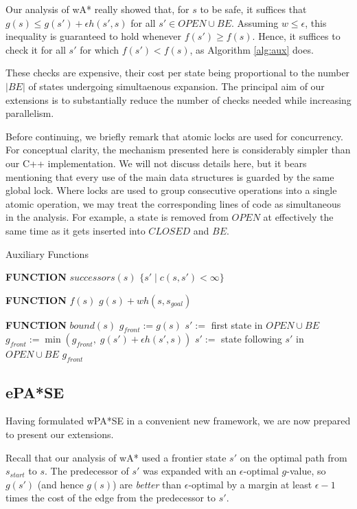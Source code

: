 \documentclass[letterpaper]{article}
\begin{document}
Our analysis of wA* really showed that, for $s$ to be safe, it suffices that $g(s) \le g(s') + \epsilon h(s', s)$ for all $s'\in OPEN\cup BE$. Assuming $w \le \epsilon$, this inequality is guaranteed to hold whenever $f(s') \ge f(s)$. Hence, it suffices to check it for all $s'$ for which $f(s') < f(s)$, as Algorithm \ref{alg:aux} does.

These checks are expensive, their cost per state being proportional to the number $|BE|$ of states undergoing simultaenous expansion. The principal aim of our extensions is to substantially reduce the number of checks needed while increasing parallelism.

Before continuing, we briefly remark that atomic locks are used for concurrency. For conceptual clarity, the mechanism presented here is considerably simpler than our C++ implementation. We will not discuss details here, but it bears mentioning that every use of the main data structures is guarded by the same global lock. Where locks are used to group consecutive operations into a single atomic operation, we may treat the corresponding lines of code as simultaneous in the analysis. For example, a state is removed from $OPEN$ at effectively the same time as it gets inserted into $CLOSED$ and $BE$.

\begin{algorithm}
\caption{Auxiliary Functions}
\label{alg:aux}
\begin{algorithmic}
\STATE \textbf{FUNCTION} $successors(s)$
\RETURN $\{s' \mid c(s,s')<\infty\}$

\STATE \textbf{FUNCTION} $f(s)$
\RETURN $g(s) + wh(s,s_{goal})$

\STATE \textbf{FUNCTION} $bound(s)$
\STATE $g_{front} := g(s)$
\STATE $s' :=$ first state in $OPEN \cup BE$
\STATE $g_{front} := \min(g_{front},\;g(s') + \epsilon h(s',s))$
\STATE $s' :=$ state following $s'$ in $OPEN \cup BE$
\ENDWHILE
\RETURN $g_{front}$
\end{algorithmic}
\end{algorithm}

\subsection{ePA*SE}

Having formulated wPA*SE in a convenient new framework, we are now prepared to present our extensions.

Recall that our analysis of wA* used a frontier state $s'$ on the optimal path from $s_{start}$ to $s$. The predecessor of $s'$ was expanded with an $\epsilon$-optimal $g$-value, so $g(s')$ (and hence $g(s)$) are \textit{better} than $\epsilon$-optimal by a margin at least $\epsilon -1$ times the cost of the edge from the predecessor to $s'$.
\end{document}
